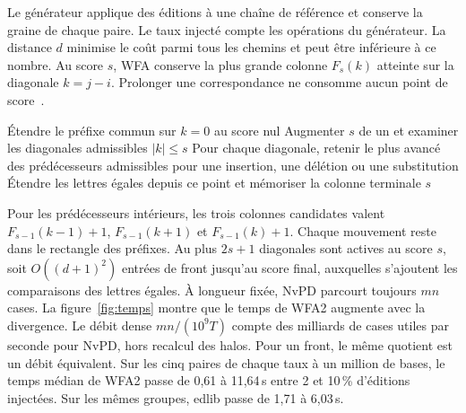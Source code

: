 Le générateur applique des éditions à une chaîne de référence et conserve la graine de chaque paire. Le taux injecté compte les opérations du générateur. La distance \(d\) minimise le coût parmi tous les chemins et peut être inférieure à ce nombre. Au score \(s\), WFA conserve la plus grande colonne \(F_s(k)\) atteinte sur la diagonale \(k=j-i\). Prolonger une correspondance ne consomme aucun point de score~\cite{wfa}.
\begin{algorithmic}[1]
\State Étendre le préfixe commun sur \(k=0\) au score nul
\State Augmenter \(s\) de un et examiner les diagonales admissibles \(|k|\le s\)
\State Pour chaque diagonale, retenir le plus avancé des prédécesseurs admissibles pour une insertion, une délétion ou une substitution
\State Étendre les lettres égales depuis ce point et mémoriser la colonne terminale
\EndWhile
\State \Return \(s\)
\end{algorithmic}
Pour les prédécesseurs intérieurs, les trois colonnes candidates valent \(F_{s-1}(k-1)+1\), \(F_{s-1}(k+1)\) et \(F_{s-1}(k)+1\). Chaque mouvement reste dans le rectangle des préfixes. Au plus \(2s+1\) diagonales sont actives au score \(s\), soit \(O((d+1)^2)\) entrées de front jusqu'au score final, auxquelles s'ajoutent les comparaisons des lettres égales.
À longueur fixée, NvPD parcourt toujours \(mn\) cases. La figure~\ref{fig:temps} montre que le temps de WFA2 augmente avec la divergence. Le débit dense \(mn/(10^9 T)\) compte des milliards de cases utiles par seconde pour NvPD, hors recalcul des halos. Pour un front, le même quotient est un débit équivalent.
Sur les cinq paires de chaque taux à un million de bases, le temps médian de WFA2 passe de 0,61 à 11,64\,s entre 2 et 10\,\% d'éditions injectées. Sur les mêmes groupes, edlib passe de 1,71 à 6,03\,s.

